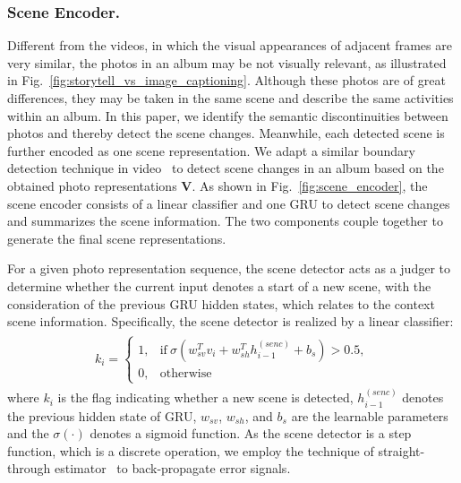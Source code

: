 \documentclass[letterpaper]{article} \usepackage{aaai19}  \usepackage{times}  \usepackage{helvet}  \usepackage{courier}  \usepackage{url}  \usepackage{graphicx}  \usepackage{color}
\begin{document}
\subsubsection{Scene Encoder.}
\label{sec:scene_encoder}
Different from the videos, in which the visual appearances of adjacent frames are very similar, the photos in an album may be not visually relevant, as illustrated in Fig.~\ref{fig:storytell_vs_image_captioning}. Although these photos are of great differences, they may be taken in the same scene and describe the same activities within an album. In this paper, we identify the semantic discontinuities between photos and thereby detect the scene changes. Meanwhile, each detected scene is further encoded as one scene representation. We adapt a similar boundary detection technique in video~\cite{baraldi2016hierarchical} to detect scene changes in an album based on the obtained photo representations $\mathbf{V}$.
As shown in Fig.~\ref{fig:scene_encoder}, the scene encoder consists of a linear classifier and one GRU to detect scene changes and summarizes the scene information. The two components couple together to generate the final scene representations.  

For a given photo representation sequence, the scene detector acts as a judger to determine whether the current input denotes a start of a new scene, with the consideration of the previous GRU hidden states, which relates to the context scene information. Specifically, the scene detector is realized by a linear classifier: \begin{align}
\label{eq:boundary_detector}
\begin{split}
k_i = \left\{
\begin{array}{rcl}
1, & {\textrm{if} \ \sigma\left(w_{sv}^Tv_i + w_{sh}^Th^{(senc)}_{i-1} + b_s\right)>0.5,}\\
0, & {\textrm{otherwise}}
\end{array} \right.
\end{split}
\end{align}
where $k_i$ is the flag indicating whether a new scene is detected, $h^{(senc)}_{i-1}$ denotes the previous hidden state of GRU, $w_{sv}$, $w_{sh}$, and $b_s$ are the learnable parameters and the $\sigma(\cdot)$ denotes a sigmoid function. As the scene detector is a step function, which is a discrete operation, we employ the technique of straight-through estimator~\cite{bengio2013estimating} to back-propagate error signals.
\end{document}
